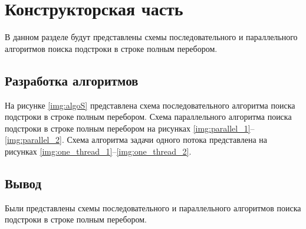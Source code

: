 \chapter{Конструкторская часть}

В данном разделе будут представлены схемы последовательного и параллельного алгоритмов поиска подстроки в строке полным перебором.

\section{Разработка алгоритмов}

На рисунке \ref{img:algoS} представлена схема последовательного алгоритма поиска подстроки в строке полным перебором. Схема параллельного алгоритма поиска подстроки в строке полным перебором на рисунках \ref{img:parallel_1}--\ref{img:parallel_2}. Схема алгоритма задачи одного потока представлена на рисунках \ref{img:one_thread_1}--\ref{img:one_thread_2}.
\clearpage
{}
\clearpage

\section*{Вывод}

Были представлены схемы последовательного и параллельного алгоритмов поиска подстроки в строке полным перебором.
